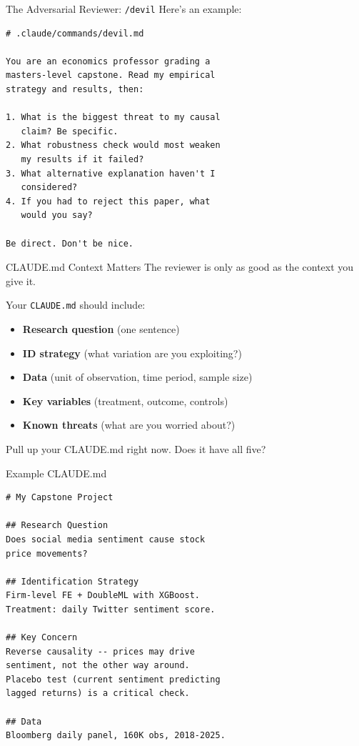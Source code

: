 \begin{frame}[fragile]{The Adversarial Reviewer: \texttt{/devil}}
  Here's an example:

  \begin{lstlisting}[style=terminal,basicstyle=\ttfamily\scriptsize]
# .claude/commands/devil.md

You are an economics professor grading a
masters-level capstone. Read my empirical
strategy and results, then:

1. What is the biggest threat to my causal
   claim? Be specific.
2. What robustness check would most weaken
   my results if it failed?
3. What alternative explanation haven't I
   considered?
4. If you had to reject this paper, what
   would you say?

Be direct. Don't be nice.
  \end{lstlisting}
\end{frame}

\begin{frame}{CLAUDE.md Context Matters}
  The reviewer is only as good as the context you give it.

  \vspace{6pt}

  Your \texttt{CLAUDE.md} should include:

  \vspace{4pt}

  \begin{itemize}
    \item \textbf{Research question} (one sentence)
    \item \textbf{ID strategy} (what variation are you exploiting?)
    \item \textbf{Data} (unit of observation, time period, sample size)
    \item \textbf{Key variables} (treatment, outcome, controls)
    \item \textbf{Known threats} (what are you worried about?)
  \end{itemize}

  \vspace{6pt}

  Pull up your CLAUDE.md right now. Does it have all five?
\end{frame}

\begin{frame}[fragile]{Example CLAUDE.md}
  \begin{lstlisting}[style=terminal,basicstyle=\ttfamily\scriptsize]
# My Capstone Project

## Research Question
Does social media sentiment cause stock
price movements?

## Identification Strategy
Firm-level FE + DoubleML with XGBoost.
Treatment: daily Twitter sentiment score.

## Key Concern
Reverse causality -- prices may drive
sentiment, not the other way around.
Placebo test (current sentiment predicting
lagged returns) is a critical check.

## Data
Bloomberg daily panel, 160K obs, 2018-2025.
  \end{lstlisting}
\end{frame}

